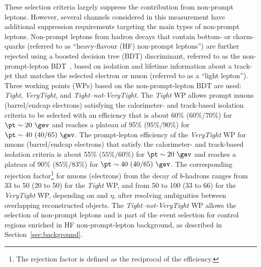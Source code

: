\documentclass[cernpreprint, atlasdraft=false, texlive=2023, UKenglish, texmf, orcidlogo]{atlasdoc}
\begin{document}
These selection criteria largely suppress the contribution from non-prompt leptons. However, several channels considered in this measurement have additional suppression requirements targeting the main types of non-prompt leptons. Non-prompt leptons from hadron decays that contain bottom- or charm-quarks (referred to as \enquote{heavy-flavour (HF) non-prompt leptons}) are further rejected using a boosted decision tree (BDT) discriminant, referred to as the non-prompt-lepton BDT~\cite{HIGG-2017-02}, based on isolation and lifetime information about a track-jet that matches the selected electron or muon (referred to as a \enquote{light lepton}). Three working points (WPs) based on the non-prompt-lepton BDT are used: \textit{Tight}, \textit{VeryTight}, and \textit{Tight--not-VeryTight}.
The \textit{Tight} WP allows prompt muons (barrel/endcap electrons) satisfying the calorimeter- and track-based isolation criteria to be selected with an efficiency that is about 60\% ($60\%/70\%$) for $\pt \sim 20~\gev$ and reaches a plateau of 95\% ($95\%/90\%$) for $\pt \sim 40\ (40/65)~\gev$.
The prompt-lepton efficiency of the \textit{VeryTight} WP for muons (barrel/endcap electrons) that satisfy the calorimeter- and track-based isolation criteria is about 55\% ($55\%/60\%$) for $\pt \sim 20~\gev$ and reaches a plateau of 90\% ($85\%/83\%$) for $\pt \sim 40\ (40/65)~\gev$. The corresponding rejection factor\footnote{The rejection factor is defined as the reciprocal of the efficiency.} for muons (electrons) from the decay of $b$-hadrons ranges from 33 to 50 (20 to 50) for the \textit{Tight} WP, and from 50 to 100 (33 to 66) for the \textit{VeryTight} WP, depending on \pt and $\eta$, after resolving ambiguities between overlapping reconstructed objects.
The \textit{Tight--not-VeryTight} WP allows the selection of non-prompt leptons and is part of the event selection for control regions enriched in HF non-prompt-lepton background, as described in Section~\ref{sec:background}.
 
\end{document}
